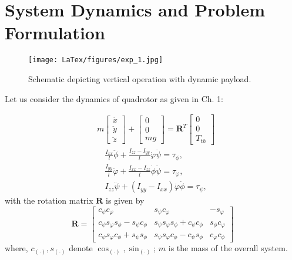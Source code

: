 \section{System Dynamics and Problem Formulation}
\begin{figure}
	\centering
	\texttt{[image: LaTex/figures/exp\_1.jpg]}%
	\caption{{Schematic depicting vertical operation with dynamic payload.}}\label{fig:dyn} %
\end{figure}

Let us consider the dynamics of quadrotor as given in Ch. 1:

\begin{align}\label{sw_pos_dyn}
    &m 
    \begin{bmatrix}
        \ddot{x}\\ 
        \ddot{y}\\ 
        \ddot{z}
    \end{bmatrix} + 
    \begin{bmatrix}
        0\\ 
        0\\ 
        mg
    \end{bmatrix} = \mathbf{R}^T 
    \begin{bmatrix}
        0\\ 
        0\\
        T_{th}
    \end{bmatrix}
\end{align}
\begin{align}
    &\frac{I_{xx}}{l}\ddot{\phi} + \frac{I_{zz}-I_{yy}}{l}\dot{\varphi}\dot{\psi} = \tau_\phi,\nonumber\\
&\frac{I_{yy}}{l}\ddot{\varphi} + \frac{I_{xx}-I_{zz}}{l}\dot{\phi}\dot{\psi}= \tau_\varphi, \nonumber\\
& I_{zz}\ddot{\psi} + (I_{yy}-I_{xx})\dot{\varphi}\dot{\phi}= \tau_\psi, 
\end{align} \label{sw_att_sub}
with the rotation matrix $\mathbf R$ is given by 
$$\mathbf{R} =\begin{bmatrix}
		c_\psi c_\varphi & s_\psi c_\varphi & -s_\varphi \\
		c_\psi s_\varphi s_\phi  - s_\psi c_\phi & s_\psi s_\varphi s_\phi  + c_\psi c_\phi & s_\phi  c_\varphi\\
		 c_\psi s_\varphi c_\phi + s_\psi s_\phi  &  s_\psi s_\varphi c_\phi - c_\psi s_\phi  & c_\varphi c_\phi
		\end{bmatrix}$$
where, $c_{(\cdot)},s_{(\cdot)}$ denote $\cos_{(\cdot)},\sin_{(\cdot)}$; $m$ is the mass of the overall system.


